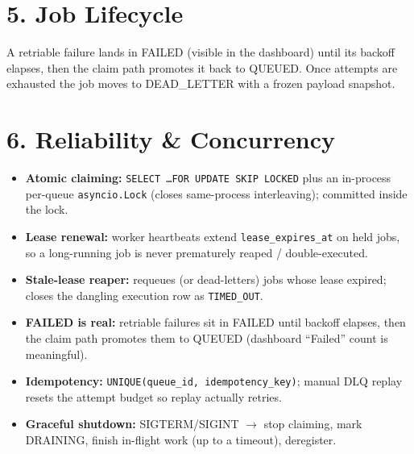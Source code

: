 \documentclass[11pt]{article}
\begin{document}
\section*{5. Job Lifecycle}
\begin{center}
\end{center}
A retriable failure lands in FAILED (visible in the dashboard) until its backoff elapses, then the
claim path promotes it back to QUEUED. Once attempts are exhausted the job moves to DEAD\_LETTER with
a frozen payload snapshot.

\section*{6. Reliability \& Concurrency}
\begin{itemize}
  \item \textbf{Atomic claiming:} \texttt{SELECT \ldots FOR UPDATE SKIP LOCKED} plus an in-process per-queue
        \texttt{asyncio.Lock} (closes same-process interleaving); committed inside the lock.
  \item \textbf{Lease renewal:} worker heartbeats extend \texttt{lease\_expires\_at} on held jobs, so a
        long-running job is never prematurely reaped / double-executed.
  \item \textbf{Stale-lease reaper:} requeues (or dead-letters) jobs whose lease expired; closes the
        dangling execution row as \texttt{TIMED\_OUT}.
  \item \textbf{FAILED is real:} retriable failures sit in FAILED until backoff elapses, then the claim
        path promotes them to QUEUED (dashboard ``Failed'' count is meaningful).
  \item \textbf{Idempotency:} \texttt{UNIQUE(queue\_id, idempotency\_key)}; manual DLQ replay resets the
        attempt budget so replay actually retries.
  \item \textbf{Graceful shutdown:} SIGTERM/SIGINT $\to$ stop claiming, mark DRAINING, finish in-flight
        work (up to a timeout), deregister.
\end{itemize}
\end{document}
